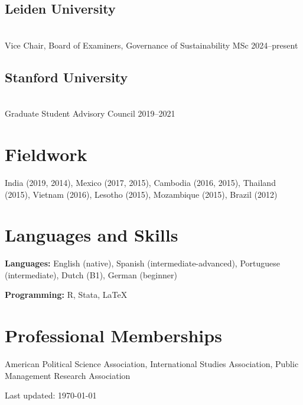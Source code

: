 \documentclass[11pt, letterpaper]{article}
\newcommand{\cventry}[2]{\noindent #1 \hfill #2\par}
\begin{document}
\vspace{0.5em}

\subsection{Leiden University} \hfill \\
\cventry{Vice Chair, Board of Examiners, Governance of Sustainability MSc}{2024--present}

\vspace{0.5em}

\subsection{Stanford University} \hfill \\
\cventry{Graduate Student Advisory Council}{2019--2021}

\section{Fieldwork}

India (2019, 2014), Mexico (2017, 2015), Cambodia (2016, 2015), Thailand (2015), Vietnam (2016), Lesotho (2015), Mozambique (2015), Brazil (2012)

\section{Languages and Skills}

\textbf{Languages:} English (native), Spanish (intermediate-advanced), Portuguese (intermediate), Dutch (B1), German (beginner)

\vspace{0.3em}

\textbf{Programming:} R, Stata, \LaTeX

\section{Professional Memberships}

American Political Science Association, International Studies Association, Public Management Research Association

\vspace{1.5em}

\begin{center}
{\footnotesize Last updated: \today}
\end{center}
\end{document}
